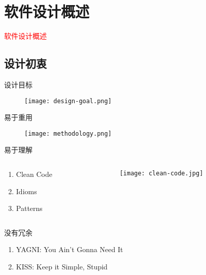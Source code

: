 \section{软件设计概述}
\label{sec:introduction}

\begin{frame}
  \begin{center}
    \Huge{\textcolor{red}{软件设计概述}}
  \end{center}
\end{frame}

\subsection{设计初衷}

\begin{frame}{设计目标}
  \begin{figure}
    \centering
    \texttt{[image: design-goal.png]}
  \end{figure}
\end{frame}

\begin{frame}{易于重用}
  \begin{figure}
    \centering
    \texttt{[image: methodology.png]}
  \end{figure}
\end{frame}

\begin{frame}{易于理解}
  \begin{columns} 
  \begin{column}{0.3\textwidth}
  \begin{enumerate}
    \item \alert{Clean Code}
    \item \alert{Idioms}
    \item \alert{Patterns}
  \end{enumerate}
  \end{column}  

  \begin{column}{0.7\textwidth}
  \begin{figure}
    \centering
    \texttt{[image: clean-code.jpg]}
  \end{figure}
  \end{column}
  \end{columns}   
\end{frame}

\begin{frame}{没有冗余}
  \begin{enumerate}
    \item \alert{YAGNI}: You Ain't Gonna Need It
    \item \alert{KISS}: Keep it Simple, Stupid
  \end{enumerate}
\end{frame}

